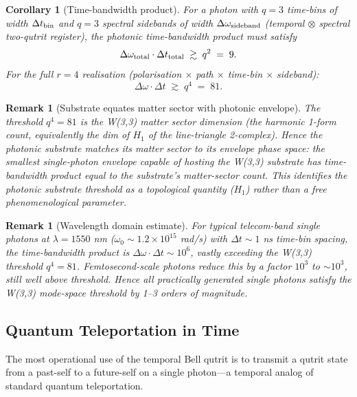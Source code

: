 ﻿\documentclass[12pt]{article}
\newtheorem{corollary}[theorem]{Corollary}
\newtheorem{remark}[theorem]{Remark}
\begin{document}
\begin{corollary}[Time-bandwidth product]\label{cor:tb_product}
For a photon with $q = 3$ time-bins of width $\Delta t_{\rm bin}$ and
$q = 3$ spectral sidebands of width $\Delta\omega_{\rm sideband}$
(temporal $\otimes$ spectral two-qutrit register), the photonic
time-bandwidth product must satisfy
\begin{equation}
  \Delta\omega_{\rm total} \cdot \Delta t_{\rm total}
  \;\gtrsim\;
  q^2 \;=\; 9.
\end{equation}
For the full $r = 4$ realisation (polarisation $\times$ path $\times$
time-bin $\times$ sideband):
\begin{equation}
  \Delta\omega \cdot \Delta t \;\gtrsim\; q^4 \;=\; 81.
\end{equation}
\end{corollary}

\begin{remark}[Substrate equates matter sector with photonic envelope]
The threshold $q^4 = 81$ is the W(3,3) matter sector dimension (the
harmonic 1-form count, equivalently the dim of $H_1$ of the line-triangle
2-complex).  Hence the photonic substrate \emph{matches its matter sector
to its envelope phase space}: the smallest single-photon envelope capable
of hosting the W(3,3) substrate has time-bandwidth product equal to the
substrate's matter-sector count.  This identifies the photonic substrate
threshold as a topological quantity ($H_1$) rather than a free
phenomenological parameter.
\end{remark}

\begin{remark}[Wavelength domain estimate]
For typical telecom-band single photons at $\lambda = 1550$ nm
($\omega_0 \sim 1.2 \times 10^{15}$ rad/s) with $\Delta t \sim 1$ ns
time-bin spacing, the time-bandwidth product is
$\Delta\omega \cdot \Delta t \sim 10^{6}$, vastly exceeding the W(3,3)
threshold $q^4 = 81$.  Femtosecond-scale photons reduce this by a factor
$10^3$ to $\sim 10^3$, still well above threshold.  Hence \emph{all
practically generated single photons satisfy the W(3,3) mode-space
threshold by 1--3 orders of magnitude}.
\end{remark}

\subsection{Quantum Teleportation in Time}
\label{sec:time_teleportation}

The most operational use of the temporal Bell qutrit is to transmit a qutrit
state from a past-self to a future-self on a single photon---a temporal
analog of standard quantum teleportation.
\end{document}
